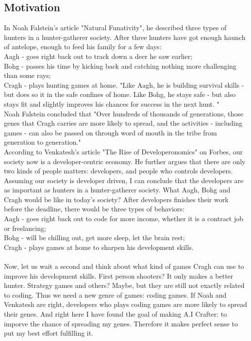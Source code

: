 \documentclass[12pt]{article}
\begin{document}
\subsection{Motivation}
In Noah Falstein's article "Natural Funativity"\cite{noah2004}, he described three types of hunters in a hunter-gatherer society. After three hunters have got enough haunch of antelope, enough to feed his family for a few days:\\
Aagh - goes right back out to track down a deer he saw earlier;\\
Bohg - passes his time by kicking back and catching nothing more challenging than some rays;\\
Cragh - plays hunting games at home. "Like Aagh, he is building survival skills - but does so it in the safe confines of home. Like Bohg, he stays safe - but also stays fit and slightly improves his chances for success in the next hunt. "\\
Noah Falstein concluded that "Over hundreds of thousands of generations, those genes that Cragh carries are more likely to spread, and the activities - including games - can also be passed on through word of mouth in the tribe from generation to generation."\\

According to Venkatesh's article "The Rise of Developeronomics"\cite{venkatesh2011} on Forbes, our society now is a developer-centric economy. He further argues that there are only two kinds of people matters: developers, and people who controls developers. Assuming our society is developer driven, I can conclude that the developers are as important as hunters in a hunter-gatherer society. What Aagh, Bohg and Cragh would be like in today's society? After developers finishes their work before the deadline, there would be three types of behaviors:\\
Aagh - goes right back out to code for more income, whether it is a contract job or freelancing;\\
Bohg - will be chilling out, get more sleep, let the brain rest;\\
Cragh - plays games at home to sharpen his development skills.\\ 
\\
Now, let us wait a second and think about what kind of games Cragh can use to improve his development skills. First person shooters? It only makes a better hunter. Strategy games and others? Maybe, but they are still not exactly related to coding. Thus we need a new genre of games: coding games. If Noah and Venkatesh are right, developers who plays coding games are more likely to spread their genes. And right here I have found the goal of making A.I Crafter: to imporve the chance of spreading my genes. Therefore it makes perfect sense to put my best effort fulfilling it.
\end{document}
